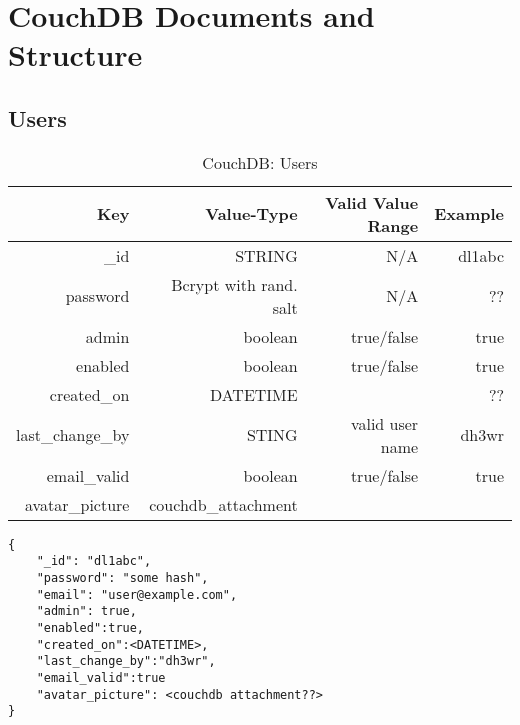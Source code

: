 \section{CouchDB Documents and Structure}



\subsection{Users}

\begin{table}[h]
 \caption{CouchDB: Users}
 \begin{tabular}{r|r|r|r}
  Key & Value-Type & Valid Value Range & Example \\
  \hline
  \_id & STRING & N/A & dl1abc \\
  password & Bcrypt with rand. salt & N/A & ?? \\
  admin & boolean & true/false & true \\
  enabled & boolean & true/false & true \\
  created\_on & DATETIME & & ??\\
  last\_change\_by & STING & valid user name & dh3wr \\
  email\_valid & boolean & true/false & true \\
  avatar\_picture & couchdb\_attachment & & \\
  \end{tabular}
  \label{tab:couchdb:users}
\end{table}

\begin{lstlisting}
{
	"_id": "dl1abc",
	"password": "some hash",
    "email": "user@example.com",
    "admin": true,
    "enabled":true,
    "created_on":<DATETIME>,
    "last_change_by":"dh3wr",
    "email_valid":true
    "avatar_picture": <couchdb attachment??>
}
\end{lstlisting}

